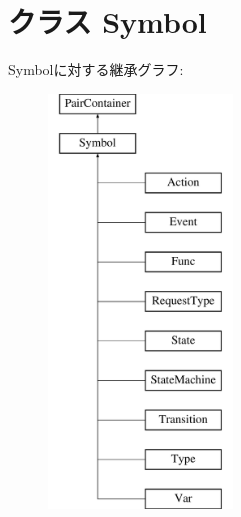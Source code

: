 \hypertarget{classslicc_1_1symbols_1_1Symbol_1_1Symbol}{
\section{クラス Symbol}
\label{classslicc_1_1symbols_1_1Symbol_1_1Symbol}
}
Symbolに対する継承グラフ:\begin{figure}[H]
\begin{center}
\leavevmode
\includegraphics[height=11cm]{classslicc_1_1symbols_1_1Symbol_1_1Symbol}
\end{center}
\end{figure}
